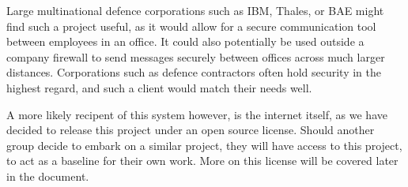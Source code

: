 Large multinational defence corporations such as IBM, Thales, or BAE might find
such a project useful, as it would allow for a secure communication tool between
employees in an office. It could also potentially be used outside a company
firewall to send messages securely between offices across much larger distances.
Corporations such as defence contractors often hold security in the highest
regard, and such a client would match their needs well.

A more likely recipent of this system however, is the internet itself, as we
have decided to release this project under an open source license. Should
another group decide to embark on a similar project, they will have access to
this project, to act as a baseline for their own work. More on this license
will be covered later in the document.
